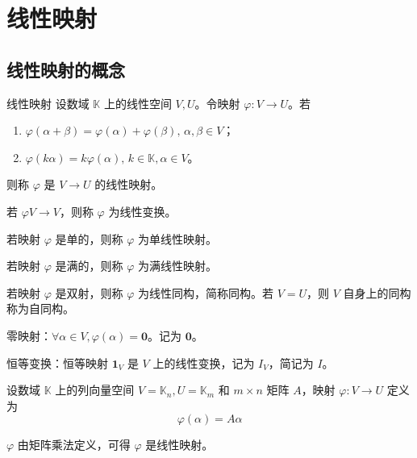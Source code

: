 \chapter{线性映射}


\section{线性映射的概念}

\begin{definition}{线性映射}
    设数域 $\mathbb{K}$ 上的线性空间 $V,U$。令映射 $\varphi : V \to U$。若
    \begin{enumerate}
        \item $\varphi(\alpha + \beta) = \varphi(\alpha) + \varphi(\beta),\, \alpha,\beta \in V$；
        \item $\varphi(k\alpha) = k\varphi(\alpha),\, k \in \mathbb{K},\alpha \in V$。
    \end{enumerate}
    则称 $\varphi$ 是 $V \to U$ 的线性映射。

    若 $\varphi V \to V$，则称 $\varphi$ 为线性变换。

    若映射 $\varphi$ 是单的，则称 $\varphi$ 为单线性映射。

    若映射 $\varphi$ 是满的，则称 $\varphi$ 为满线性映射。

    若映射 $\varphi$ 是双射，则称 $\varphi$ 为线性同构，简称同构。若 $V = U$，则 $V$ 自身上的同构称为自同构。
\end{definition}

\hfill

\begin{example}
    零映射：$\forall \alpha \in V, \varphi(\alpha) = \mathbf{0}$。记为 $\mathbf{0}$。
\end{example}

\hfill

\begin{example}
    恒等变换：恒等映射 $\mathbf{1}_V$ 是 $V$ 上的线性变换，记为 $I_V$，简记为 $I$。
\end{example}

\hfill

\begin{example}
    设数域 $\mathbb{K}$ 上的列向量空间 $V = \mathbb{K}_n, U = \mathbb{K}_m$ 和 $m \times n$ 矩阵 $A$，映射 $\varphi : V \to U$ 定义为
    \[\varphi(\alpha) = A\alpha\]

    $\varphi$ 由矩阵乘法定义，可得 $\varphi$ 是线性映射。
\end{example}

